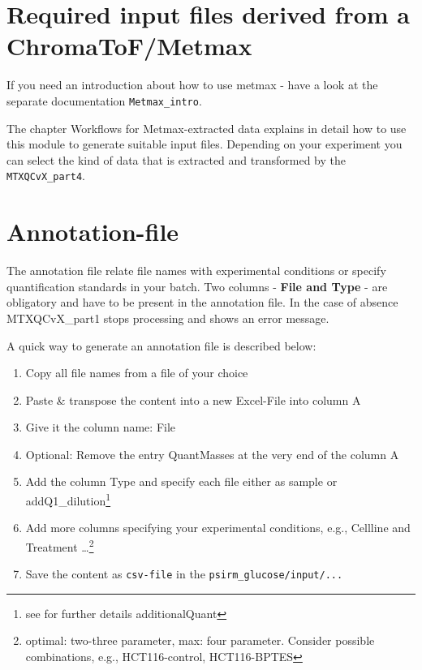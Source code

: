 \documentclass[]{book}
\providecommand{\tightlist}{%
  \setlength{\itemsep}{0pt}\setlength{\parskip}{0pt}}
\let\rmarkdownfootnote\footnote%
\def\footnote{\protect\rmarkdownfootnote}
\theoremstyle{definition}
\theoremstyle{definition}
\theoremstyle{definition}
\theoremstyle{remark}
\begin{document}
\section{Required input files derived from a
ChromaToF/Metmax}\label{required-input-files-derived-from-a-chromatofmetmax}

If you need an introduction about how to use metmax - have a look at the
separate documentation \texttt{Metmax\_intro}.

The chapter Workflows for Metmax-extracted data explains in detail how
to use this module to generate suitable input files. Depending on your
experiment you can select the kind of data that is extracted and
transformed by the \texttt{MTXQCvX\_part4}.

\section{Annotation-file}\label{annotation-file-1}

The annotation file relate file names with experimental conditions or
specify quantification standards in your batch. Two columns -
\textbf{File and Type} - are obligatory and have to be present in the
annotation file. In the case of absence MTXQCvX\_part1 stops processing
and shows an error message.

A quick way to generate an annotation file is described below:

\begin{enumerate}
\def\labelenumi{\arabic{enumi}.}
\tightlist
\item
  Copy all file names from a file of your choice
\item
  Paste \& transpose the content into a new Excel-File into column A
\item
  Give it the column name: File
\item
  Optional: Remove the entry QuantMasses at the very end of the column A
\item
  Add the column Type and specify each file either as sample or
  addQ1\_dilution\footnote{see for further details additionalQuant}
\item
  Add more columns specifying your experimental conditions, e.g.,
  Cellline and Treatment \ldots{}\footnote{optimal: two-three parameter,
    max: four parameter. Consider possible combinations, e.g.,
    HCT116-control, HCT116-BPTES}
\item
  Save the content as \texttt{csv-file} in the
  \texttt{psirm\_glucose/input/...}
\end{enumerate}
\end{document}
